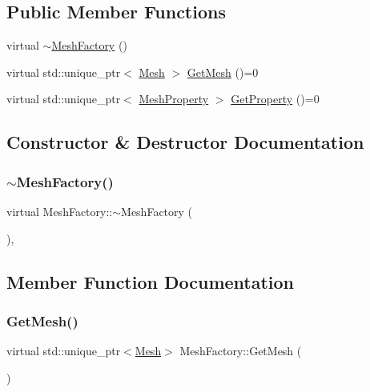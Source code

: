 \subsection*{Public Member Functions}
\begin{DoxyCompactItemize}
\item 
virtual \mbox{\hyperlink{class_mesh_factory_ad1c44f90fbd6b710a422371dc02eb9c3}{$\sim$\+Mesh\+Factory}} ()
\item 
virtual std\+::unique\+\_\+ptr$<$ \mbox{\hyperlink{class_mesh}{Mesh}} $>$ \mbox{\hyperlink{class_mesh_factory_a4cc58b609d0f4f5209cf5245e16f0720}{Get\+Mesh}} ()=0
\item 
virtual std\+::unique\+\_\+ptr$<$ \mbox{\hyperlink{class_mesh_property}{Mesh\+Property}} $>$ \mbox{\hyperlink{class_mesh_factory_abff50d215458843dd98271ab803a7671}{Get\+Property}} ()=0
\end{DoxyCompactItemize}


\subsection{Constructor \& Destructor Documentation}
\mbox{\label{class_mesh_factory_ad1c44f90fbd6b710a422371dc02eb9c3}} 
\subsubsection{\texorpdfstring{$\sim$MeshFactory()}{~MeshFactory()}}
{\footnotesize\ttfamily virtual Mesh\+Factory\+::$\sim$\+Mesh\+Factory (\begin{DoxyParamCaption}{ }\end{DoxyParamCaption})\hspace{0.3cm}{\ttfamily [inline]}, {\ttfamily [virtual]}}



\subsection{Member Function Documentation}
\mbox{\label{class_mesh_factory_a4cc58b609d0f4f5209cf5245e16f0720}} 
\subsubsection{\texorpdfstring{GetMesh()}{GetMesh()}}
{\footnotesize\ttfamily virtual std\+::unique\+\_\+ptr$<$\mbox{\hyperlink{class_mesh}{Mesh}}$>$ Mesh\+Factory\+::\+Get\+Mesh (\begin{DoxyParamCaption}{ }\end{DoxyParamCaption})\hspace{0.3cm}{\ttfamily [pure virtual]}}



